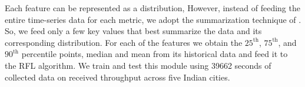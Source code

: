 \indent  Each feature can be represented as a distribution, 
 However, instead of feeding the entire time-series data for each metric, we adopt the summarization technique of \cite{Raca2019}. So, we feed only a few key values that best summarize the data and its corresponding distribution. %
 For each of the features we obtain the $\mathrm{25^{th}}$, $\mathrm{75^{th}}$, and $\mathrm{90^{th}}$ percentile points, median and mean from its historical data and feed it to the \ac{RFL} algorithm. We train and test this module using 39662 seconds of collected data on received throughput across five Indian cities.
